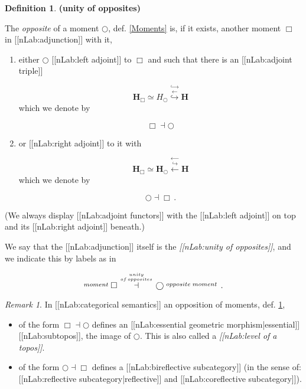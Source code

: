 \documentclass[12pt,titlepage]{article}
\theoremstyle{plain}
\theoremstyle{definition}
\newtheorem{defn}{Definition}
\theoremstyle{remark}
\newtheorem{remark}{Remark}
\begin{document}
\begin{defn}
\label{UnityOfOpposites}\hypertarget{UnityOfOpposites}{}
\textbf{(unity of opposites)}

The \emph{opposite} of a moment $\bigcirc$, def. \ref{Moments} is, if it exists, another moment $\Box$ in [[nLab:adjunction]] with it,

\begin{enumerate}%
\item either $\bigcirc$ [[nLab:left adjoint]] to $\Box$ and such that there is an [[nLab:adjoint triple]]

\begin{displaymath}
\mathbf{H}_{\Box}\simeq H_{\bigcirc}
  \stackrel{\hookrightarrow}{\stackrel{\longleftarrow}{\hookrightarrow}}
  \mathbf{H}
\end{displaymath}
which we denote by

\begin{displaymath}
\Box \dashv \bigcirc
\end{displaymath}

\item or [[nLab:right adjoint]] to it with

\begin{displaymath}
\mathbf{H}_{\Box}\simeq \mathbf{H}_{\bigcirc}
  \stackrel{\longleftarrow}{\stackrel{\hookrightarrow}{\longleftarrow}}
  \mathbf{H}
\end{displaymath}
which we denote by

\begin{displaymath}
\bigcirc \dashv \Box
  \,.
\end{displaymath}


\end{enumerate}
(We always display [[nLab:adjoint functors]] with the [[nLab:left adjoint]] on top and its [[nLab:right adjoint]] beneath.)

We say that the [[nLab:adjunction]] itself is the \emph{[[nLab:unity of opposites]]}, and we indicate this by labels as in

\begin{displaymath}
\stackrel{moment}{} \Box \stackrel{unity \atop {of\,opposites}}{\dashv} \bigcirc \stackrel{opposite\;moment}{}
  \,.
\end{displaymath}
\end{defn}
\begin{remark}
\label{}\hypertarget{}{}
In [[nLab:categorical semantics]] an opposition of moments, def. \ref{UnityOfOpposites},

\begin{itemize}%
\item of the form $\Box \dashv \bigcirc$ defines an [[nLab:essential geometric morphism|essential]] [[nLab:subtopos]], the image of $\bigcirc$. This is also called a \emph{[[nLab:level of a topos]]}.


\item of the form $\bigcirc \dashv \Box$ defines a [[nLab:bireflective subcategory]] (in the sense of: [[nLab:reflective subcategory|reflective]] and [[nLab:coreflective subcategory]]).



\end{itemize}
\end{remark}
\end{document}

